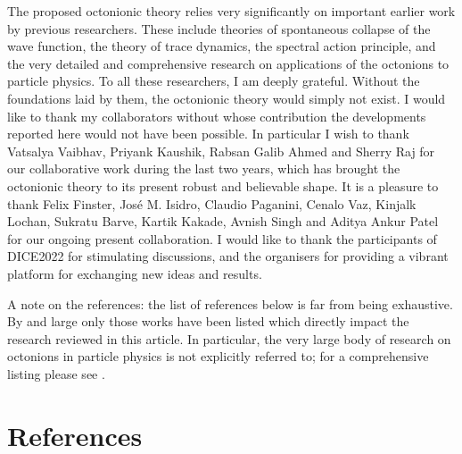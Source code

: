 \documentclass[a4paper]{jpconf}
\begin{document}
\ack The proposed octonionic theory relies very significantly on important earlier work by previous researchers. These include theories of spontaneous collapse of the wave function, the theory of trace dynamics, the spectral action principle, and the very detailed and comprehensive research on applications of the octonions to particle physics. To all these researchers, I am deeply grateful. Without the foundations laid by them, the octonionic theory would simply not exist. I would like to thank my collaborators without whose contribution the developments reported here would not have been possible. In particular I wish to thank Vatsalya Vaibhav, Priyank Kaushik, Rabsan Galib Ahmed and Sherry Raj for our collaborative work during the last two years, which has brought the octonionic theory to its present robust and believable shape. It is a pleasure to thank Felix Finster, Jos\'e M. Isidro, Claudio Paganini, Cenalo Vaz, Kinjalk Lochan, Sukratu Barve, Kartik Kakade, Avnish Singh and Aditya Ankur Patel for our ongoing present collaboration. I would like to thank the participants of DICE2022 for stimulating discussions, and the organisers for providing a vibrant platform for exchanging new ideas and results.

A note on the references: the list of references below is far from being exhaustive. By and large only those works have been listed which directly impact the research reviewed in this article. In particular, the very large body of research on octonions in particle physics is not explicitly referred to; for a comprehensive listing please see \cite{Singh2021}.

\section*{References}
\end{document}
